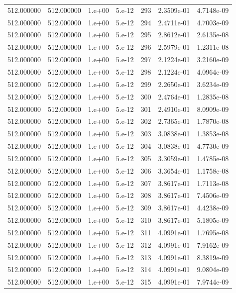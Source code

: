 \begin{table}[htbp]
\begin{tabular}{rrrrrrr}
512.000000 & 512.000000 & 1.e+00 & 5.e-12 & 293 & 2.3509e-01 & 4.7148e-09 \\
512.000000 & 512.000000 & 1.e+00 & 5.e-12 & 294 & 2.4711e-01 & 4.7003e-09 \\
512.000000 & 512.000000 & 1.e+00 & 5.e-12 & 295 & 2.8612e-01 & 2.6135e-08 \\
512.000000 & 512.000000 & 1.e+00 & 5.e-12 & 296 & 2.5979e-01 & 1.2311e-08 \\
512.000000 & 512.000000 & 1.e+00 & 5.e-12 & 297 & 2.1224e-01 & 3.2160e-09 \\
512.000000 & 512.000000 & 1.e+00 & 5.e-12 & 298 & 2.1224e-01 & 4.0964e-09 \\
512.000000 & 512.000000 & 1.e+00 & 5.e-12 & 299 & 2.2650e-01 & 3.6234e-09 \\
512.000000 & 512.000000 & 1.e+00 & 5.e-12 & 300 & 2.4764e-01 & 1.2835e-08 \\
512.000000 & 512.000000 & 1.e+00 & 5.e-12 & 301 & 2.4910e-01 & 8.0909e-09 \\
512.000000 & 512.000000 & 1.e+00 & 5.e-12 & 302 & 2.7365e-01 & 1.7870e-08 \\
512.000000 & 512.000000 & 1.e+00 & 5.e-12 & 303 & 3.0838e-01 & 1.3853e-08 \\
512.000000 & 512.000000 & 1.e+00 & 5.e-12 & 304 & 3.0838e-01 & 4.7730e-09 \\
512.000000 & 512.000000 & 1.e+00 & 5.e-12 & 305 & 3.3059e-01 & 1.4785e-08 \\
512.000000 & 512.000000 & 1.e+00 & 5.e-12 & 306 & 3.3654e-01 & 1.1758e-08 \\
512.000000 & 512.000000 & 1.e+00 & 5.e-12 & 307 & 3.8617e-01 & 1.7113e-08 \\
512.000000 & 512.000000 & 1.e+00 & 5.e-12 & 308 & 3.8617e-01 & 7.4506e-09 \\
512.000000 & 512.000000 & 1.e+00 & 5.e-12 & 309 & 3.8617e-01 & 4.4238e-09 \\
512.000000 & 512.000000 & 1.e+00 & 5.e-12 & 310 & 3.8617e-01 & 5.1805e-09 \\
512.000000 & 512.000000 & 1.e+00 & 5.e-12 & 311 & 4.0991e-01 & 1.7695e-08 \\
512.000000 & 512.000000 & 1.e+00 & 5.e-12 & 312 & 4.0991e-01 & 7.9162e-09 \\
512.000000 & 512.000000 & 1.e+00 & 5.e-12 & 313 & 4.0991e-01 & 8.3819e-09 \\
512.000000 & 512.000000 & 1.e+00 & 5.e-12 & 314 & 4.0991e-01 & 9.0804e-09 \\
512.000000 & 512.000000 & 1.e+00 & 5.e-12 & 315 & 4.0991e-01 & 7.9744e-09 \\

\end{tabular}
\end{table}
